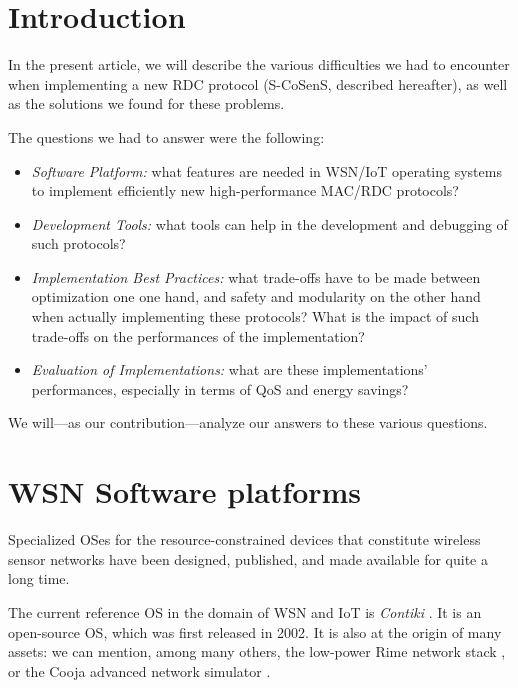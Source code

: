 \documentclass[conference]{IEEEtran}
\begin{document}
\IEEEpeerreviewmaketitle



\section{Introduction}

In the present article, we will describe the various difficulties we had
to encounter when implementing a new RDC protocol (S-CoSenS, described
hereafter), as well as the solutions we found for these problems.

The questions we had to answer were the following:
\begin{itemize}
\item \emph{Software Platform:} what features are needed in WSN/IoT operating
      systems to implement efficiently new high-performance MAC/RDC protocols?
\item \emph{Development Tools:} what tools can help in the development and
      debugging of such protocols?
\item \emph{Implementation Best Practices:} what trade-offs have to be made
      between optimization one one hand, and safety and modularity on the
      other hand when actually implementing these protocols? What is the
      impact of such trade-offs on the performances of the implementation?
\item \emph{Evaluation of Implementations:} what are these implementations'
      performances, especially in terms of QoS and energy savings?
\end{itemize}

We will---as our contribution---analyze our answers to these various
questions.



\section{WSN Software platforms}

Specialized OSes for the resource-constrained devices that constitute
wireless sensor networks have been designed, published, and made available
for quite a long time.


The current reference OS in the domain of WSN and IoT is \emph{Contiki}
\cite{ContikiOS}. It is an open-source OS, which was first released
in 2002. It is also at the origin of many assets: we can mention, among
many others, the low-power Rime network stack \cite{Rime}, or the Cooja
advanced network simulator \cite{Cooja}.
\end{document}
